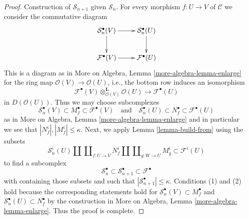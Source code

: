 \documentclass[10pt,a4paper]{amsart}
\theoremstyle{plain}
\theoremstyle{definition}
\theoremstyle{remark}
\numberwithin{equation}{subsection}
\begin{document}
\begin{proof}
\medskip\noindent
Construction of $\mathcal{S}_{n + 1}$ given $\mathcal{S}_n$.
For every morphism $f : U \to V$ of $\mathcal{C}$
we consider the commutative diagram
$$
\xymatrix{
\mathcal{S}_n^\bullet(V)
\ar[r] \ar[d] &
\mathcal{S}_n^\bullet(U) \ar[d] \\
\mathcal{F}^\bullet(V)
\ar[r] &
\mathcal{F}^\bullet(U)
}
$$
This is a diagram as in More on Algebra, Lemma \ref{more-algebra-lemma-enlarge}
for the ring map $\mathcal{O}(V) \to \mathcal{O}(U)$, i.e., the bottom row
induces an isomorphism
$$
\mathcal{F}^\bullet(V) \otimes_{\mathcal{O}(V)}^\mathbf{L} \mathcal{O}(U)
\longrightarrow
\mathcal{F}^\bullet(U)
$$
in $D(\mathcal{O}(U))$. Thus we may choose subcomplexes
$$
\mathcal{S}_n^\bullet(V) \subset M^\bullet_f \subset \mathcal{F}^\bullet(V)
\quad\text{and}\quad
\mathcal{S}_n^\bullet(U) \subset N^\bullet_f \subset \mathcal{F}^\bullet(U)
$$
as in More on Algebra, Lemma \ref{more-algebra-lemma-enlarge}
and in particular we see that $|N^i_f|, |M^i_f| \leq \kappa$. Next, we apply
Lemma \ref{lemma-build-from} using the subsets
$$
\mathcal{S}_n^i(U) \amalg \coprod\nolimits_{f : U \to V} N^i_f
\amalg \coprod\nolimits_{g : W \to U} M^i_g
\subset
\mathcal{F}^i(U)
$$
to find a subcomplex
$$
\mathcal{S}_n^\bullet \subset
\mathcal{S}_{n + 1}^\bullet \subset
\mathcal{F}^\bullet
$$
with containing those subsets and such that
$|\mathcal{S}_{n + 1}^\bullet| \leq \kappa$.
Conditions (1) and (2) hold because the corresponding statements
hold for 
$\mathcal{S}_n^\bullet(V) \subset M^\bullet_f$ and
$\mathcal{S}_n^\bullet(U) \subset N^\bullet_f$ by the construction in
More on Algebra, Lemma \ref{more-algebra-lemma-enlarge}.
Thus the proof is complete.
\end{proof}
\end{document}
